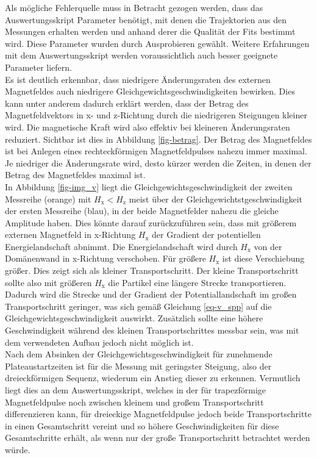 \documentclass[page,pdftex,12pt,a4paper,twoside,openright]{scrbook}
\begin{document}
Als mögliche Fehlerquelle muss in Betracht gezogen werden, dass das Auswertungsskript Parameter benötigt, mit denen die Trajektorien aus den Messungen erhalten werden und anhand derer die Qualität der Fits bestimmt wird. Diese Parameter wurden durch Ausprobieren gewählt. Weitere Erfahrungen mit dem Auswertungsskript werden voraussichtlich auch besser geeignete Parameter liefern.\\

Es ist deutlich erkennbar, dass niedrigere Änderungsraten des externen Magnetfeldes auch niedrigere Gleichgewichtsgeschwindigkeiten bewirken. Dies kann unter anderem dadurch erklärt werden, dass der Betrag des Magnetfeldvektors in x- und z-Richtung durch die niedrigeren Steigungen kleiner wird. Die magnetische Kraft wird also effektiv bei kleineren Änderungsraten reduziert. Sichtbar ist dies in Abbildung \ref{fig-betrag}. Der Betrag des Magnetfeldes ist bei Anlegen eines rechteckförmigen Magnetfeldpulses nahezu immer maximal. Je niedriger die Änderungsrate wird, desto kürzer werden die Zeiten, in denen der Betrag des Magnetfeldes maximal ist.\\

In Abbildung \ref{fig-img_v} liegt die Gleichgewichtsgeschwindigkeit der zweiten Messreihe (orange) mit \(H_\mathrm{x} < H_\mathrm{z}\) meist über der Gleichgewichtstgeschwindigkeit der ersten Messreihe (blau), in der beide Magnetfelder nahezu die gleiche Amplitude haben. Dies könnte darauf zurückzuführen sein, dass mit größerem externen Magnetfeld in x-Richtung \(H_\mathrm{x}\) der Gradient der potentiellen Energielandschaft abnimmt. Die Energielandschaft wird durch \(H_\mathrm{x}\) von der Domänenwand in x-Richtung verschoben. Für größere \(H_\mathrm{x}\) ist diese Verschiebung größer. Dies zeigt sich als kleiner Transportschritt. Der kleine Transportschritt sollte also mit größeren \(H_\mathrm{x}\) die Partikel eine längere Strecke transportieren. Dadurch wird die Strecke und der Gradient der Potentiallandschaft im großen Transportschritt geringer, was sich gemäß Gleichung \ref{eq-v_spp} auf die Gleichgewichtsgeschwindigkeit auswirkt. Zusätzlich sollte eine höhere Geschwindigkeit während des kleinen Transportschrittes messbar sein, was mit dem verwendeten Aufbau jedoch nicht möglich ist.\\

Nach dem Absinken der Gleichgewichtsgeschwindigkeit für zunehmende Plateaustartzeiten ist für die Messung mit geringster Steigung, also der dreieckförmigen Sequenz, wiederum ein Anstieg dieser zu erkennen. Vermutlich liegt dies an dem Auswertungsskript, welches in der für trapezförmige Magnetfeldpulse noch zwischen kleinem und großem Transportschritt differenzieren kann, für dreieckige Magnetfeldpulse jedoch beide Transportschritte in einen Gesamtschritt vereint und so höhere Geschwindigkeiten für diese Gesamtschritte erhält, als wenn nur der große Transportschritt betrachtet werden würde.\\
\end{document}
